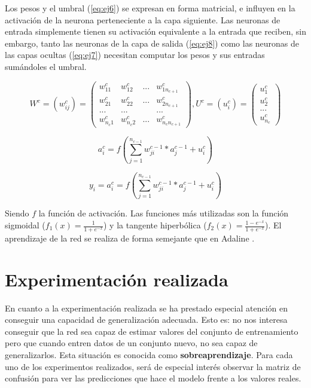 \documentclass[11pt,spanish,listoffigures,listoftables]{workluis}
\begin{document}
\par Los pesos y el umbral (\ref{eq:ej6}) se expresan en forma matricial, e influyen en la activación de la neurona perteneciente a la capa siguiente. Las neuronas de entrada simplemente tienen su activación equivalente a la entrada que reciben, sin embargo, tanto las neuronas de la capa de salida (\ref{eq:ej8}) como las neuronas de las capas ocultas (\ref{eq:ej7}) necesitan computar los pesos y sus entradas sumándoles el umbral.

\begin{equation}\label{eq:ej6}
W^c = (w_{ij}^c) = \begin{pmatrix}
w_{11}^c & w_{12}^c & ... & w_{1n_{c+1}}^c\\ 
w_{21}^c & w_{22}^c & ... & w_{2n_{c+1}}^c\\ 
... & ... & & ...\\ 
w_{n_{c}1}^c & w_{n_{c}2}^c & ... & w_{n_{c}n_{c+1}}^c 
\end{pmatrix}  ,  U^c = (u_{i}^c) = \begin{pmatrix}
u_{1}^c\\ 
u_{2}^c\\ 
...\\ 
u_{n_{c}}^c 
\end{pmatrix}
\end{equation}

\begin{equation}\label{eq:ej7}
a_{i}^c = f(\sum_{j=1}^{n_{c-1}}w_{ji}^{c-1}*a_{j}^{c-1} + u_{i}^{c})
\end{equation} 

\begin{equation}\label{eq:ej8}
y_{i} = a_{i}^c = f(\sum_{j=1}^{n_{c-1}}w_{ji}^{c-1}*a_{j}^{c-1} + u_{i}^{c})
\end{equation} 

\par Siendo $f$ la función de activación. Las funciones más utilizadas son la función sigmoidal ($f_{1}(x) = \frac{1}{1+e^{-x}}$) y la tangente hiperbólica ($f_{2}(x) = \frac{1-e^{-x}}{1+e^{-x}}$). El aprendizaje de la red se realiza de forma semejante que en Adaline \cite{MLP}.

\section{Experimentación realizada}

\par En cuanto a la experimentación realizada se ha prestado especial atención en conseguir una capacidad de generalización adecuada. Esto es: no nos interesa conseguir que la red sea capaz de estimar valores del conjunto de entrenamiento pero que cuando entren datos de un conjunto nuevo, no sea capaz de generalizarlos. Esta situación es conocida como \textbf{sobreaprendizaje}. Para cada uno de los experimentos realizados, será de especial interés observar la matriz de confusión para ver las predicciones que hace el modelo frente a los valores reales.
\end{document}
